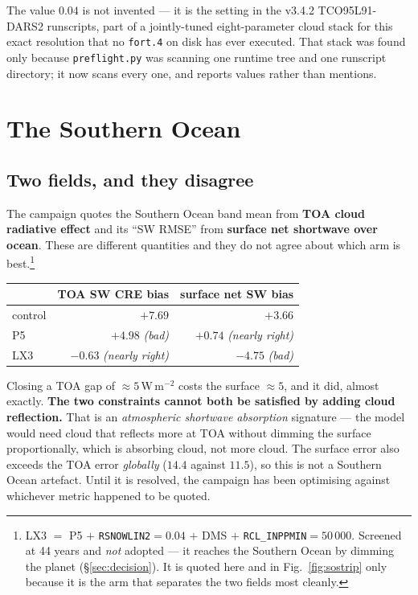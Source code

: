 \documentclass[10pt]{article}
\begin{document}
The value $0.04$ is not invented --- it is the setting in the v3.4.2 TCO95L91-DARS2
runscripts, part of a jointly-tuned eight-parameter cloud stack for this exact resolution
that no \texttt{fort.4} on disk has ever executed. That stack was found only because
\texttt{preflight.py} was scanning one runtime tree and one runscript directory; it now
scans every one, and reports values rather than mentions.

\section{The Southern Ocean}\label{sec:so}

\subsection{Two fields, and they disagree}
The campaign quotes the Southern Ocean band mean from \textbf{TOA cloud radiative effect}
and its ``SW RMSE'' from \textbf{surface net shortwave over ocean}. These are different
quantities and they do not agree about which arm is best.\footnote{LX3 $=$ P5 $+$ \texttt{RSNOWLIN2}$=0.04$ $+$ DMS $+$ \texttt{RCL\_INPPMIN}$=50\,000$. Screened at 44 years and \emph{not} adopted --- it reaches the Southern Ocean by dimming the planet (\S\ref{sec:decision}). It is quoted here and in Fig.~\ref{fig:sostrip} only because it is the arm that separates the two fields most cleanly.}

\begin{center}\footnotesize
\begin{tabular}{l r r}
\toprule
& TOA SW CRE bias & surface net SW bias \\
\midrule
control & $+7.69$ & $+3.66$ \\
P5 & $+4.98$ \emph{(bad)} & $+0.74$ \emph{(nearly right)} \\
LX3 & $-0.63$ \emph{(nearly right)} & $-4.75$ \emph{(bad)} \\
\bottomrule
\end{tabular}
\end{center}

Closing a TOA gap of ${\approx}5$\,W\,m$^{-2}$ costs the surface ${\approx}5$, and it did,
almost exactly. \textbf{The two constraints cannot both be satisfied by adding cloud
reflection.} That is an \emph{atmospheric shortwave absorption} signature --- the model
would need cloud that reflects more at TOA without dimming the surface proportionally,
which is absorbing cloud, not more cloud. The surface error also exceeds the TOA error
\emph{globally} ($14.4$ against $11.5$), so this is not a Southern Ocean artefact. Until it
is resolved, the campaign has been optimising against whichever metric happened to be
quoted.
\end{document}
